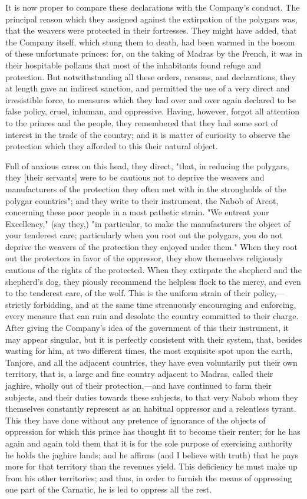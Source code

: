 It is now proper to compare these declarations with the Company's conduct. The principal reason which they assigned against the extirpation of the polygars was, that the weavers were protected in their fortresses. They might have added, that the Company itself, which stung them to death, had been warmed in the bosom of these unfortunate princes: for, on the taking of Madras by the French, it was in their hospitable pollams that most of the inhabitants found refuge and protection. But notwithstanding all these orders, reasons, and declarations, they at length gave an indirect sanction, and permitted the use of a very direct and irresistible force, to measures which they had over and over again declared to be false policy, cruel, inhuman, and oppressive. Having, however, forgot all attention to the princes and the people, they remembered that they had some sort of interest in the trade of the country; and it is matter of curiosity to observe the protection which they afforded to this their natural object.

Full of anxious cares on this head, they direct, "that, in reducing the polygars, they [their servants] were to be cautious not to deprive the weavers and manufacturers of the protection they often met with in the strongholds of the polygar countries"; and they write to their instrument, the Nabob of Arcot, concerning these poor people in a most pathetic strain. "We entreat your Excellency," (say they,) "in particular, to make the manufacturers the object of your tenderest care; particularly when you root out the polygars, you do not deprive the weavers of the protection they enjoyed under them." When they root out the protectors in favor of the oppressor, they show themselves religiously cautious of the rights of the protected. When they extirpate the shepherd and the shepherd's dog, they piously recommend the helpless flock to the mercy, and even to the tenderest care, of the wolf. This is the uniform strain of their policy,—strictly forbidding, and at the same time strenuously encouraging and enforcing, every measure that can ruin and desolate the country committed to their charge. After giving the Company's idea of the government of this their instrument, it may appear singular, but it is perfectly consistent with their system, that, besides wasting for him, at two different times, the most exquisite spot upon the earth, Tanjore, and all the adjacent countries, they have even voluntarily put their own territory, that is, a large and fine country adjacent to Madras, called their jaghire, wholly out of their protection,—and have continued to farm their subjects, and their duties towards these subjects, to that very Nabob whom they themselves constantly represent as an habitual oppressor and a relentless tyrant. This they have done without any pretence of ignorance of the objects of oppression for which this prince has thought fit to become their renter; for he has again and again told them that it is for the sole purpose of exercising authority he holds the jaghire lands; and he affirms (and I believe with truth) that he pays more for that territory than the revenues yield. This deficiency he must make up from his other territories; and thus, in order to furnish the means of oppressing one part of the Carnatic, he is led to oppress all the rest.


